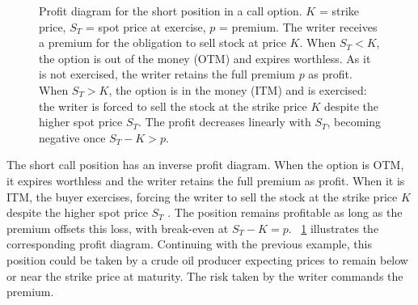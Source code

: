 \documentclass[english,12pt,a4paper,pdftex,sci,utf8]{aaltothesis}
\begin{document}
\begin{figure}[H]
\centering
  
    \caption{Profit diagram for the short position in a call option. $K$ = strike price, $S_T$ = spot price at exercise, $p$ = premium. The writer receives a premium for the obligation to sell stock at price $K$. When $S_T < K$, the option is out of the money (OTM) and expires worthless. As it is not exercised, the writer retains the full premium $p$ as profit. When $S_T > K$, the option is in the money (ITM) and is exercised: the writer is forced to sell the stock at the strike price $K$ despite the higher spot price $S_T$. The profit decreases linearly with $S_T$, becoming negative once $S_T - K > p$.}

    \label{fig:short_call_payoff}
\end{figure}

The short call position has an inverse profit diagram. When the option is OTM, it expires worthless and the writer retains the full premium as profit. When it is ITM, the buyer exercises, forcing the writer to sell the stock at the strike price $K$ despite the higher spot price $S_T$ \cite{hull2013fundamentals}. The position remains profitable as long as the premium offsets this loss, with break-even at $S_T - K = p$. ~\cref{fig:short_call_payoff} illustrates the corresponding profit diagram. Continuing with the previous example, this position could be taken by a crude oil producer expecting prices to remain below or near the strike price at maturity. The risk taken by the writer commands the premium.
\end{document}
